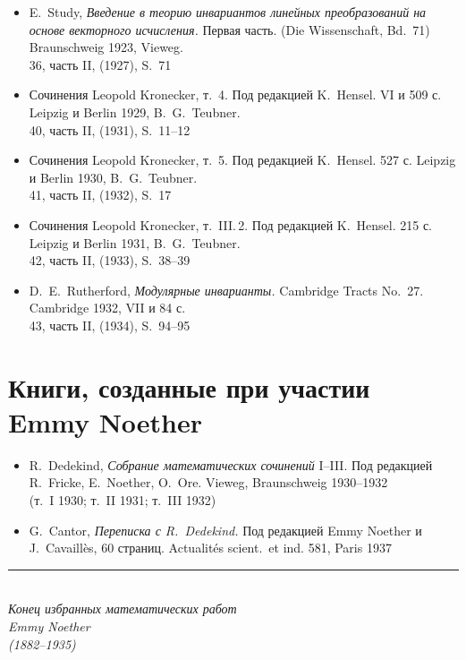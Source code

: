 \documentclass[11pt]{article}
\newcommand{\foreign}[1]{#1}
\begin{document}
\begin{itemize}[leftmargin=1.5em,itemsep=0.2em]
\item E.\ Study, \textit{Введение в теорию инвариантов линейных преобразований на основе векторного исчисления.} Первая часть. (\foreign{Die Wissenschaft}, Bd.~71) Braunschweig 1923, Vieweg.\\
36, часть II, (1927), S.~71

\item Сочинения Leopold Kronecker, т.~4. Под редакцией K.\ Hensel. VI и 509 с. Leipzig и Berlin 1929, B.\ G.\ Teubner.\\
40, часть II, (1931), S.~11--12

\item Сочинения Leopold Kronecker, т.~5. Под редакцией K.\ Hensel. 527 с. Leipzig и Berlin 1930, B.\ G.\ Teubner.\\
41, часть II, (1932), S.~17

\item Сочинения Leopold Kronecker, т.~III.\,2. Под редакцией K.\ Hensel. 215 с. Leipzig и Berlin 1931, B.\ G.\ Teubner.\\
42, часть II, (1933), S.~38--39

\item D.\ E.\ Rutherford, \textit{Модулярные инварианты.} \foreign{Cambridge Tracts No.~27.} Cambridge 1932, VII и 84 с.\\
43, часть II, (1934), S.~94--95
\end{itemize}

\newpage
\section*{Книги, созданные при участии Emmy Noether}

\begin{itemize}[leftmargin=1.5em,itemsep=0.5em]
\item R.\ Dedekind, \textit{Собрание математических сочинений} I--III. Под редакцией R.\ Fricke, E.\ Noether, O.\ Ore. Vieweg, Braunschweig 1930--1932\\
(т.~I 1930; т.~II 1931; т.~III 1932)

\item G.\ Cantor, \textit{Переписка с R.\ Dedekind.} Под редакцией Emmy Noether и J.\ Cavaillès, 60 страниц. \foreign{Actualités scient.\ et ind.} 581, Paris 1937
\end{itemize}

\vfill

\begin{center}
\rule{0.5\textwidth}{0.4pt}\\[1em]
\textit{Конец избранных математических работ}\\[0.5em]
\textit{Emmy Noether}\\[0.5em]
\textit{(1882--1935)}
\end{center}
\end{document}
